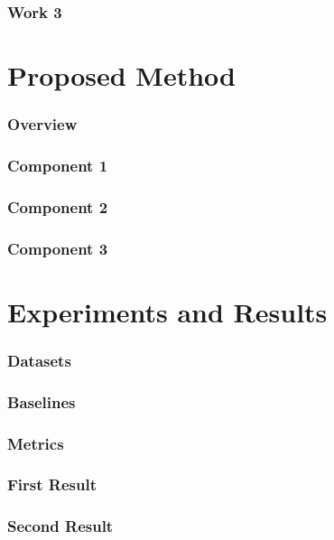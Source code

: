\documentclass{article}
\begin{document}
\begin{frame}
\frametitle{Work 3}

\end{frame}

\section{Proposed Method}

\begin{frame}
\frametitle{Overview}

\end{frame}


\begin{frame}
\frametitle{Component 1}

\end{frame}

\begin{frame}
\frametitle{Component 2}

\end{frame}

\begin{frame}
\frametitle{Component 3}

\end{frame}

\section{Experiments and Results}
\begin{frame}
\frametitle{Datasets}

\end{frame}

\begin{frame}
\frametitle{Baselines}


\end{frame}

\begin{frame}
\frametitle{Metrics}

\end{frame}

\begin{frame}
\frametitle{First Result}

\end{frame}

\begin{frame}
\frametitle{Second Result}

\end{frame}
\end{document}
